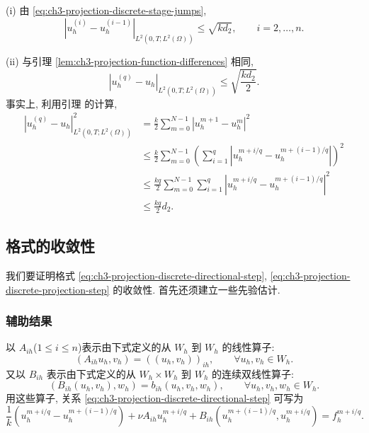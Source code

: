 \begin{Remark}
\label{rem:ch3-projection-discrete-stage-convergence}
(i) 由 \eqref{eq:ch3-projection-discrete-stage-jumps},
\begin{equation}
|u_h^{(i)}-u_h^{(i-1)}|_{L^2(0,T;L^2(\Omega))}
\leq\sqrt{kd_2},\qquad i=2,\ldots,n.
\label{eq:ch3-projection-discrete-stage-difference}
\end{equation}

(ii) 与引理 \ref{lem:ch3-projection-function-differences} 相同,
\begin{equation}
|u_h^{(q)}-u_h|_{L^2(0,T;L^2(\Omega))}
\leq\sqrt{\frac{kd_2}{2}}.
\label{eq:ch3-projection-discrete-interpolant-difference}
\end{equation}
事实上, 利用引理  的计算,
\[
\begin{aligned}
|u_h^{(q)}-u_h|_{L^2(0,T;L^2(\Omega))}^2
&=\frac{k}{2}\sum_{m=0}^{N-1}|u_h^{m+1}-u_h^m|^2\\
&\leq\frac{k}{2}\sum_{m=0}^{N-1}
\left(\sum_{i=1}^q|u_h^{m+i/q}-u_h^{m+(i-1)/q}|\right)^2\\
&\leq\frac{kq}{2}\sum_{m=0}^{N-1}\sum_{i=1}^q
|u_h^{m+i/q}-u_h^{m+(i-1)/q}|^2\\
&\leq\frac{kq}{2}d_2.
\end{aligned}
\]
\end{Remark}

\hypertarget{chapter-03-page-297}{}
\subsection{格式的收敛性}
\label{subsec:ch3-projection-convergence}

我们要证明格式 \eqref{eq:ch3-projection-discrete-directional-step}, \eqref{eq:ch3-projection-discrete-projection-step} 的收敛性. 首先还须建立一些先验估计.

\subsubsection{辅助结果}
\label{subsubsec:ch3-projection-auxiliary-results}

以 $A_{ih}$($1\leq i\leq n$)表示由下式定义的从 $W_h$ 到 $W_h$ 的线性算子:
\begin{equation}
(A_{ih}u_h,v_h)=((u_h,v_h))_{ih},
\qquad\forall u_h,v_h\in W_h.
\label{eq:ch3-projection-aih-definition}
\end{equation}
又以 $B_{ih}$ 表示由下式定义的从 $W_h\times W_h$ 到 $W_h$ 的连续双线性算子:
\begin{equation}
(B_{ih}(u_h,v_h),w_h)=b_{ih}(u_h,v_h,w_h),
\qquad\forall u_h,v_h,w_h\in W_h.
\label{eq:ch3-projection-bih-operator}
\end{equation}
用这些算子, 关系 \eqref{eq:ch3-projection-discrete-directional-step} 可写为
\begin{equation}
\frac1k(u_h^{m+i/q}-u_h^{m+(i-1)/q})
+\nu A_{ih}u_h^{m+i/q}
+B_{ih}(u_h^{m+(i-1)/q},u_h^{m+i/q})
=f_h^{m+i/q}.
\label{eq:ch3-projection-discrete-operator-form}
\end{equation}

